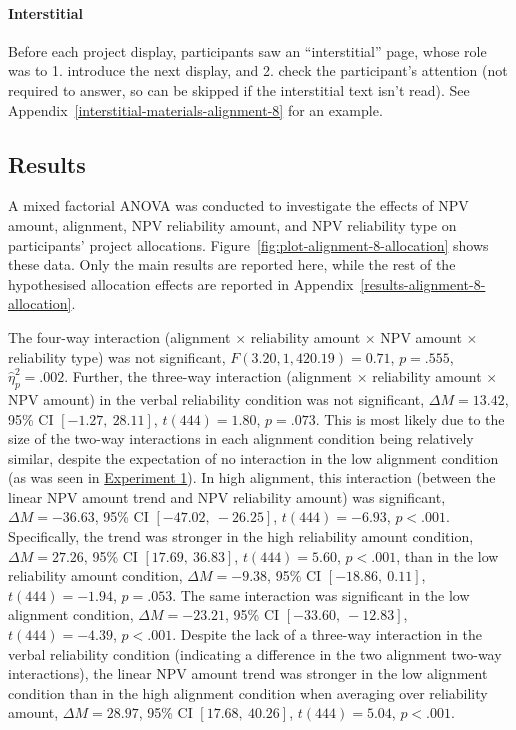 \documentclass[a4paper, nobind, dvipsnames]{templates/ociamthesis}
\theoremstyle{definition}
\theoremstyle{definition}
\theoremstyle{definition}
\theoremstyle{definition}
\theoremstyle{remark}
\begin{document}
\paragraph{Interstitial}

Before each project display, participants saw an ``interstitial'' page, whose role
was to 1. introduce the next display, and 2. check the participant's attention
(not required to answer, so can be skipped if the interstitial text isn't read).
See Appendix~\ref{interstitial-materials-alignment-8} for an example.

\subsection{Results}

A mixed factorial ANOVA was conducted to investigate the effects of NPV amount,
alignment, NPV reliability amount, and NPV reliability type on participants'
project allocations. Figure~\ref{fig:plot-alignment-8-allocation} shows these
data. Only the main results are reported here, while the rest of the
hypothesised allocation effects are reported in
Appendix~\ref{results-alignment-8-allocation}.

The four-way interaction (alignment \(\times\) reliability amount \(\times\) NPV
amount \(\times\) reliability type) was not significant,
\(F(3.20, 1,420.19) = 0.71\), \(p = .555\), \(\hat{\eta}^2_p = .002\). Further, the three-way interaction
(alignment \(\times\) reliability amount \(\times\) NPV amount) in the verbal
reliability condition was not significant,
\(\Delta M = 13.42\), 95\% CI \([-1.27,~28.11]\), \(t(444) = 1.80\), \(p = .073\). This is
most likely due to the size of the two-way interactions in each alignment
condition being relatively similar, despite the expectation of no interaction in
the low alignment condition (as was seen in \protect\hyperlink{results-alignment-2}{Experiment
1}). In high alignment, this interaction (between the
linear NPV amount trend and NPV reliability amount) was significant,
\(\Delta M = -36.63\), 95\% CI \([-47.02,~-26.25]\), \(t(444) = -6.93\), \(p < .001\).
Specifically, the trend was stronger in the high reliability amount condition,
\(\Delta M = 27.26\), 95\% CI \([17.69,~36.83]\), \(t(444) = 5.60\), \(p < .001\),
than in the low reliability amount condition,
\(\Delta M = -9.38\), 95\% CI \([-18.86,~0.11]\), \(t(444) = -1.94\), \(p = .053\).
The same interaction was significant in the low alignment condition,
\(\Delta M = -23.21\), 95\% CI \([-33.60,~-12.83]\), \(t(444) = -4.39\), \(p < .001\).
Despite the lack of a three-way interaction in the verbal reliability condition
(indicating a difference in the two alignment two-way interactions), the linear
NPV amount trend was stronger in the low alignment condition than in the high
alignment condition when averaging over reliability amount,
\(\Delta M = 28.97\), 95\% CI \([17.68,~40.26]\), \(t(444) = 5.04\), \(p < .001\).
\end{document}
